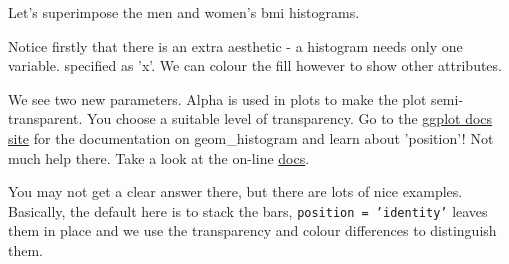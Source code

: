 \documentclass[titlepage]{book}\usepackage{knitr}
\begin{document}
Let's superimpose the men and women's bmi histograms.
\begin{knitrout}
\color{fgcolor}\begin{kframe}
\begin{alltt}
 \hlkwb{<-} \hlstd{(}  \hlstd{(}   
 \hlkwb{<-}  \hlopt{+} \hlstd{(} 
                         \hlstd{=} \hlstd{,}
                           \hlstd{=} \hlstd{,}
                            \hlstd{=} \hlstd{)}
\end{alltt}
\end{kframe}
\end{knitrout}
Notice firstly that there is an extra aesthetic - a histogram needs only one variable. specified as 'x'. We can colour the fill however to show other attributes. 

We see two new parameters. Alpha is used in plots to make the plot semi-transparent. You choose a suitable level of transparency.  Go to the \href{http://docs.ggplot2.org/}{ggplot docs site} for the documentation on geom\_histogram and learn about 'position'!  Not much help there.  Take a look at the on-line \href{https://ggplot2.tidyverse.org/reference/#section-layer-position-adjustment}{docs}.

You may not get a clear answer there, but there are lots of nice examples. Basically, the default here is to stack the bars, \texttt{position = 'identity'} leaves them in place and we use the transparency and colour differences to distinguish them.
\end{document}
